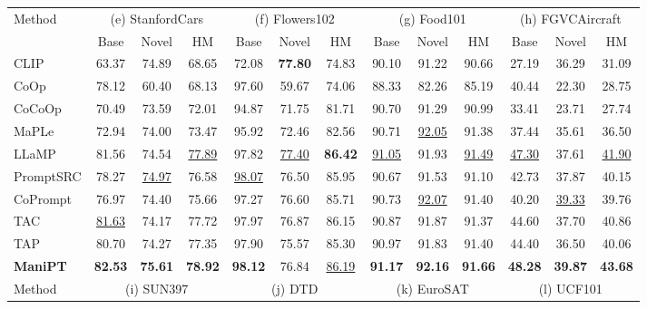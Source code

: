 \documentclass{article}
\theoremstyle{plain}
\theoremstyle{definition}
\theoremstyle{remark}
\begin{document}
\begin{table}[t!]
{\begin{tabular}{l ccc|ccc|ccc|ccc}
				\midrule
				\midrule
				\multirow{2}{*}{Method} & 
				\multicolumn{3}{c}{(e) StanfordCars} & 
				\multicolumn{3}{c}{(f) Flowers102} & 
				\multicolumn{3}{c}{(g) Food101} & 
				\multicolumn{3}{c}{(h) FGVCAircraft} \\
				\cmidrule(lr){2-4} \cmidrule(lr){5-7} \cmidrule(lr){8-10} \cmidrule(lr){11-13}
				& Base & Novel & HM & Base & Novel & HM & Base & Novel & HM & Base & Novel & HM \\
				\midrule
				CLIP       & 63.37 & 74.89 & 68.65 & 72.08 & \textbf{77.80} & 74.83 & 90.10 & 91.22 & 90.66 & 27.19 & 36.29 & 31.09 \\
				CoOp       & 78.12 & 60.40 & 68.13 & 97.60 & 59.67 & 74.06 & 88.33 & 82.26 & 85.19 & 40.44 & 22.30 & 28.75 \\
				CoCoOp     & 70.49 & 73.59 & 72.01 & 94.87 & 71.75 & 81.71 & 90.70 & 91.29 & 90.99 & 33.41 & 23.71 & 27.74 \\
				MaPLe      & 72.94 & 74.00 & 73.47 & 95.92 & 72.46 & 82.56 & 90.71 & \underline{92.05} & 91.38 & 37.44 & 35.61 & 36.50 \\
				LLaMP      & 81.56 & 74.54 & \underline{77.89} & 97.82 & \underline{77.40} & \textbf{86.42} & \underline{91.05} & 91.93 & \underline{91.49} & \underline{47.30} & 37.61 & \underline{41.90} \\
				PromptSRC  & 78.27 & \underline{74.97} & 76.58 & \underline{98.07} & 76.50 & 85.95 & 90.67 & 91.53 & 91.10 & 42.73 & 37.87 & 40.15 \\
				CoPrompt   & 76.97 & 74.40 & 75.66 & 97.27 & 76.60 & 85.71 & 90.73 & \underline{92.07} & 91.40 & 40.20 & \underline{39.33} & 39.76 \\
				TAC        & \underline{81.63} & 74.17 & 77.72 & 97.97 & 76.87 & 86.15 & 90.87 & 91.87 & 91.37 & 44.60 & 37.70 & 40.86 \\
				TAP        & 80.70 & 74.27 & 77.35 & 97.90 & 75.57 & 85.30 & 90.97 & 91.83 & 91.40 & 44.40 & 36.50 & 40.06 \\
				\rowcolor{gray!20}\textbf{ManiPT} & \textbf{82.53} & \textbf{75.61} & \textbf{78.92} & \textbf{98.12} & 76.84 & \underline{86.19} & \textbf{91.17} & \textbf{92.16} & \textbf{91.66} & \textbf{48.28} & \textbf{39.87} & \textbf{43.68} \\
				\midrule
				\midrule
				\multirow{2}{*}{Method} & 
				\multicolumn{3}{c}{(i) SUN397} & 
				\multicolumn{3}{c}{(j) DTD} & 
				\multicolumn{3}{c}{(k) EuroSAT} & 
				\multicolumn{3}{c}{(l) UCF101} \\
				\cmidrule(lr){2-4} \cmidrule(lr){5-7} \cmidrule(lr){8-10} \cmidrule(lr){11-13}

\end{tabular}}
\end{table}
\end{document}
